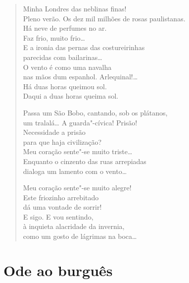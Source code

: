 \begin{verse}
Minha Londres das neblinas finas!\\
Pleno verão. Os dez mil milhões de rosas paulistanas.\\
Há neve de perfumes no ar.\\
Faz frio, muito frio\ldots{}\\
E a ironia das pernas das costureirinhas\\
parecidas com bailarinas\ldots{}\\
O vento é como uma navalha\\
nas mãos dum espanhol. Arlequinal!\ldots{}\\
Há duas horas queimou sol.\\
Daqui a duas horas queima sol.

Passa um São Bobo, cantando, sob os plátanos,\\
um tralalá\ldots{} A guarda"-cívica! Prisão!\\
Necessidade a prisão\\
para que haja civilização?\\
Meu coração sente"-se muito triste\ldots{}\\
Enquanto o cinzento das ruas arrepiadas\\
dialoga um lamento com o vento\ldots{}

Meu coração sente"-se muito alegre!\\
Este friozinho arrebitado\\
dá uma vontade de sorrir!\\
E sigo. E vou sentindo,\\
à inquieta alacridade da invernia,\\
como um gosto de lágrimas na boca\ldots{}
\end{verse}

\chapter{Ode ao burguês}

